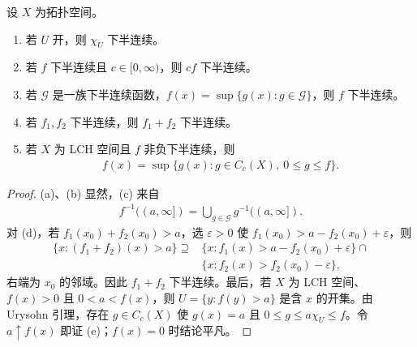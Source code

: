\documentclass[../../main.tex]{subfiles}
\begin{document}
\begin{proposition}\label{proposition:ch07-lsc-properties}
设 $X$ 为拓扑空间。
\begin{enumerate}[label=\alph*.,ref=(\alph*)]
\item\label{item:ch07-open-indicator-lsc} 若 $U$ 开，则 $\chi_U$ 下半连续。
\item\label{item:ch07-lsc-scaling} 若 $f$ 下半连续且 $c\in[0,\infty)$，则 $cf$ 下半连续。
\item\label{item:ch07-lsc-supremum} 若 $\mathscr G$ 是一族下半连续函数，$f(x)=\sup\{g(x):g\in\mathscr G\}$，则 $f$ 下半连续。
\item\label{item:ch07-lsc-sum} 若 $f_1,f_2$ 下半连续，则 $f_1+f_2$ 下半连续。
\item\label{item:ch07-lsc-continuous-minorants} 若 $X$ 为 LCH 空间且 $f$ 非负下半连续，则
\begin{align*}
f(x)=\sup\{g(x):g\in C_c(X),\ 0\leqslant g\leqslant f\}.
\end{align*}
\end{enumerate}
\end{proposition}
\begin{proof}
(a)、(b) 显然，(c) 来自
\begin{align*}
f^{-1}((a,\infty])=\bigcup_{g\in\mathscr G}g^{-1}((a,\infty]).
\end{align*}
对 (d)，若 $f_1(x_0)+f_2(x_0)>a$，选 $\varepsilon>0$ 使 $f_1(x_0)>a-f_2(x_0)+\varepsilon$，则
\begin{align*}
\{x:(f_1+f_2)(x)>a\}\supseteq{}&\{x:f_1(x)>a-f_2(x_0)+\varepsilon\}\cap{}\\
&\{x:f_2(x)>f_2(x_0)-\varepsilon\},
\end{align*}
右端为 $x_0$ 的邻域。因此 $f_1+f_2$ 下半连续。最后，若 $X$ 为 LCH 空间、$f(x)>0$ 且 $0<a<f(x)$，则 $U=\{y:f(y)>a\}$ 是含 $x$ 的开集。由 Urysohn 引理，存在 $g\in C_c(X)$ 使 $g(x)=a$ 且 $0\leqslant g\leqslant a\chi_U\leqslant f$。令 $a\uparrow f(x)$ 即证 (e)；$f(x)=0$ 时结论平凡。
\end{proof}
\end{document}
